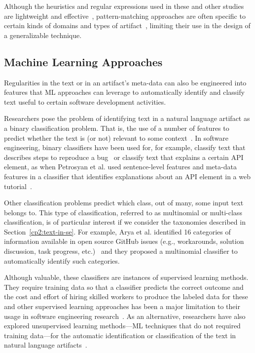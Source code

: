 Although the heuristics and regular expressions used in these and other studies~\cite{nadi2020, Maalej2013}
are lightweight and effective~\cite{Bavota2016}, 
pattern-matching approaches 
are often specific to certain kinds of domains and types of artifact~\cite{fucci2019}, 
limiting their use in the design of a generalizable technique.







\subsection{Machine Learning Approaches}
\label{cp2:machine-learning}


Regularities in the text or in an artifact's meta-data can also be 
engineered into features that \acf{ML} 
approaches can leverage to automatically identify and classify
text useful to certain software development activities. 



Researchers pose the problem of identifying text 
in a natural language artifact 
as a binary classification problem. 
That is, the use of a number of features 
to predict whether the text is (or not)
relevant to some context~\cite{}.
In software engineering, 
binary classifiers have been used for,
for example, classify text that describes steps to reproduce a bug~\cite{Chaparro2016} or 
classify text that explains a certain API element, as when 
Petrosyan et al. used 
 sentence-level features
and meta-data features in a classifier 
that 
identifies explanations about an API element  in a web tutorial~\cite{Petrosyan2015}.




Other classification problems predict which class, out of many, some input text belongs to. 
This type of classification, referred to as multinomial or multi-class classification, 
is of particular interest if 
we consider the taxonomies described in Section~\ref{cp2:text-in-se}.
For example, Arya et al. identified 16 categories of  information available
in open source GitHub issues (e.g., workarounds, solution discussion, task progress, etc.)~\cite{Arya2019}
and they proposed a multinomial classifier 
to automatically identify such categories.








Although valuable, these classifiers are instances of supervised learning methods.
They require training data so that a classifier predicts the correct outcome 
and the cost and effort of hiring skilled workers to produce 
the labeled data for these and other supervised learning approaches
has been a major limitation to their usage in software engineering research~\cite{Arpteg2018, ferreira2021}. As an alternative,
researchers have also explored 
 unsupervised learning methods---\acs{ML} techniques that do not required training data---for the automatic 
identification or classification of the text in natural language artifacts~\cite{}.






